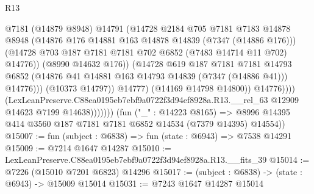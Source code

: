\begin{lexlean}{R13}
\begin{coremodule}
                                      @7181
                                      (@14879 @8948)
                                      @14791
                                      (@14728
                                        @2184
                                        @705
                                        @7181
                                        @7183
                                        @14878
                                        @8948
                                        (@14876
                                          @176
                                          @14881
                                          @163
                                          @14878
                                          @14839
                                          (@7347 (@14886 @176)))
                                        (@14728
                                          @703
                                          @187
                                          @7181
                                          @7181
                                          @702
                                          @6852
                                          (@7483 @14714 @11 @702)
                                          @14776))
                                      (@8990 @14632 @176))
                                    (@14728
                                      @619
                                      @187
                                      @7181
                                      @7181
                                      @14793
                                      @6852
                                      (@14876 @41 @14881 @163 @14793 @14839 (@7347 (@14886 @41)))
                                      @14776)))
                                (@10373 @14797))
                              @14777)
                            (@14169 @14798 @14800))
                          @14776))))
                  (LexLeanPreserve.C88ea0195eb7ebf9a0722f3d94ef8928a.R13.__rel_63
                    @12909
                    @14623
                    @7199
                    @14638)))))))
      (fun ("_" : @14223 @8165) =>
      @8996 @14395 @414 @3560 @187 @7181 @7181 @6852 @14534 (@7379 @14395) @14554))
@15007 := fun (subject : @6838) => fun (state : @6943) => @7538 @14291
@15009 := @7214 @1647 @14287
@15010 := LexLeanPreserve.C88ea0195eb7ebf9a0722f3d94ef8928a.R13.__fits_39
@15014 := @7226 (@15010 @7201 @6823) @14296
@15017 := (subject : @6838) -> (state : @6943) -> @15009 @15014
@15031 := @7243
    @1647
    @14287
    @15014

\end{coremodule}
\end{lexlean}
